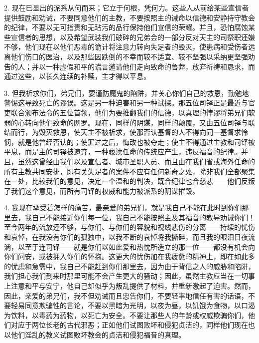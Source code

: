 2. 现在已显出的派系从何而来；它立于何根，凭何力。这些人从前给某些宣信者提供鼓励和劝诫，不要同意他们的主教，不要按照主的诫命以信德和安静持守教会的纪律，不要以无可指责和无玷污的品行保持他们宣信的荣耀。并且，恐怕腐蚀某些宣信者的思想，以及希望武装我们破碎的兄弟会的一部分反对天主的司祭职还嫌不够，他们现在以他们恶毒的诡计将注意力转向失足者的毁灭，使患病和受伤者远离他们伤口的医治，以及那些因跌倒的不幸而较不适宜、较不坚强以采纳更坚强劝告的人；并以一种虚假和平的谎言邀请他们走向致命的鲁莽，放弃祈祷和恳求，而通过这些，以长久连续的补赎，主才得以平息。\par

3. 但我祈求你们，弟兄们，要谨防魔鬼的陷阱，并关心你们自己的救恩，勤勉地警惕这导致死亡的谬误。这是另一种迫害和另一种试探。那五位司铎正是最近与官吏联合颁布法令的五位首领，他们为要推翻我们的信德，以真理的悖谬将弟兄们软弱的心转向他们致命的网罗。现在，同样的阴谋，同样的颠覆，又由五位司铎与联结而行，为毁灭救恩，使天主不被祈求，使那否认基督的人不得向同一基督求怜悯，就是他曾经否认的；使罪过之后，悔改也被夺走；使主不得通过主教和司铎被平息，而是主的司铎被遗弃，一种亵渎任命的传统应产生，违反福音的纪律。并且，虽然这曾经由我们以及宣信者、城市圣职人员、而且由在我们省或海外任命的所有主教共同安排，即有关失足者的案件不应有任何新奇之处，除非我们全部聚集在一处，比较我们的意见，决定一个温和的判决，既合纪律也合慈悲——他们反叛了我们这个意见，而所有司铎的权威和能力被派系的阴谋摧毁。\par

4. 我现在承受着怎样的痛苦，最亲爱的弟兄们，就是我自己不能在此时到你们那里去，我自己不能接近你们每一位，我自己不能按照主及其福音的教导劝诫你们！至今两年的流放还不够，与你们、与你们的容貌和视线悲伤的分离——持续的忧伤和哀悼，在我没有你们的孤独中，以我不断的哀悼将我撕碎，而且我的眼泪日夜流淌，以至于连司铎——就是你们以如此爱和热忱所造立的那一位——都没有机会向你们问安，或被拥入你们的怀抱。这更大的忧伤加在我疲惫的精神上，即在如此多的忧虑和急需中，我自己不能赶到你们那里去，因为由于背信之人的威胁和陷阱，我们担心我们到来时那里可能不会产生更大的骚动；因此，虽然主教应当在一切事上注意和平与安宁，他自己却似乎为叛乱提供了材料，并重新激起了迫害。然而，因此，亲爱的弟兄们，我不但劝诫而且忠告你们，不要轻率地信任有害的话语，不要轻易同意欺骗性的言论，不要以黑暗为光明，以夜为昼，以饥饿为食物，以口渴为饮料，以毒药为药物，以死亡为安全。不要让那些人的年龄或权威欺骗你们，他们对应于两位长老的古代邪恶；正如他们试图败坏和侵犯贞洁的，同样他们现在也以他们淫乱的教义试图败坏教会的贞洁和侵犯福音的真理。\par

